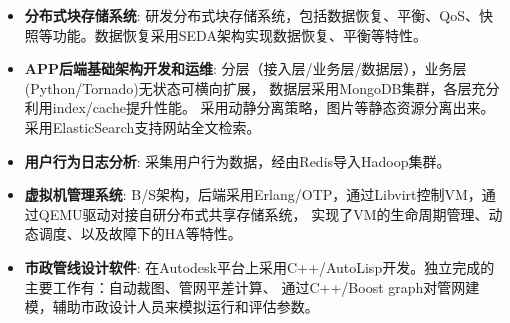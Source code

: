  \begin{itemize}[leftmargin=*]
    \item \textbf{分布式块存储系统}: 研发分布式块存储系统，包括数据恢复、平衡、QoS、快照等功能。数据恢复采用SEDA架构实现数据恢复、平衡等特性。

    \item \textbf{APP后端基础架构开发和运维}: 分层（接入层/业务层/数据层），业务层(Python/Tornado)无状态可横向扩展，
        数据层采用MongoDB集群，各层充分利用index/cache提升性能。
        采用动静分离策略，图片等静态资源分离出来。采用ElasticSearch支持网站全文检索。

    \item \textbf{用户行为日志分析}: 采集用户行为数据，经由Redis导入Hadoop集群。

    \item \textbf{虚拟机管理系统}: B/S架构，后端采用Erlang/OTP，通过Libvirt控制VM，通过QEMU驱动对接自研分布式共享存储系统，
        实现了VM的生命周期管理、动态调度、以及故障下的HA等特性。

    \item \textbf{市政管线设计软件}: 在Autodesk平台上采用C++/AutoLisp开发。独立完成的主要工作有：自动裁图、管网平差计算、
        通过C++/Boost graph对管网建模，辅助市政设计人员来模拟运行和评估参数。
  \end{itemize}

